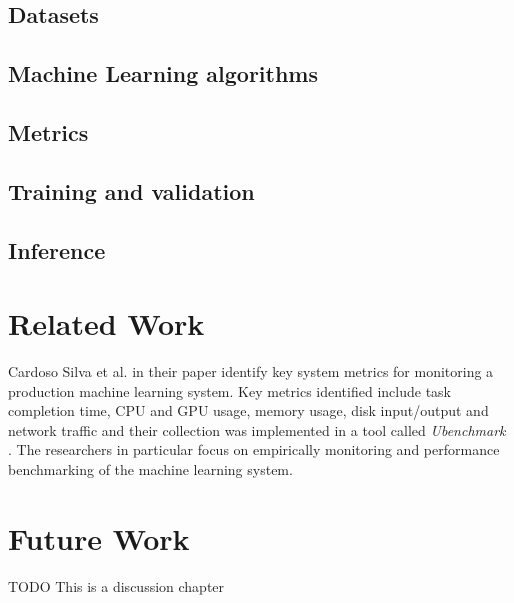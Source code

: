 \subsection{Datasets}
\subsection{Machine Learning algorithms}
\subsection{Metrics}
\subsection{Training and validation}
\subsection{Inference}


\section{Related Work}


Cardoso Silva et al. \parencite*{cardososilvaBenchmarkingMachineLearning2020} in their paper identify key system metrics for monitoring a production machine learning system. Key metrics identified include task completion time, CPU and GPU usage, memory usage, disk input/output and network traffic and their collection was implemented in a tool called \emph{Ubenchmark} \parencite{cardososilvaBenchmarkingMachineLearning2020}. The researchers in particular focus on empirically monitoring and performance benchmarking of the machine learning system.


\section{Future Work}
TODO This is a discussion chapter